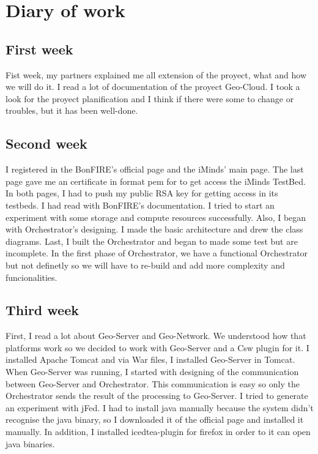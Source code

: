 
\section{Diary of work}
\label{sec:objetivos}

\subsection{First week}
Fist week, my partners explained me all extension of the proyect, what and how we will do it.
I read a lot of documentation of the proyect Geo-Cloud.
I took a look for the proyect planification and I think if there were some to change or troubles, but it has been well-done.

\subsection{Second week}
I registered in the BonFIRE's official page\cite{BF} and the iMinds' main page\cite{VW}. The last page gave me an certificate in format pem for to get access the iMinds TestBed. In both pages, I had to push my public RSA key for getting access in its testbeds.
I had read with BonFIRE's documentation. I tried to start an experiment with some storage and compute resources successfully.
Also, I began with Orchestrator's designing. I made the basic architecture and drew the class diagrams.
Last, I built the Orchestrator and  began to made some test but are incomplete. In the first phase of Orchestrator, we have a functional Orchestrator but not definetly so we will have to re-build and add more complexity and funcionalities.

\subsection{Third week}

First, I read a lot about Geo-Server\cite{GS} and Geo-Network\cite{GN}. We understood how that platforms work so we decided to work with Geo-Server and a Csw plugin for it. I installed Apache Tomcat and via War files, I installed Geo-Server in Tomcat.
When Geo-Server was running, I started with designing of the communication between Geo-Server and Orchestrator. This communication is easy so only the Orchestrator sends the result of the processing to Geo-Server.
I tried to generate an experiment with jFed\cite{jFed}. I had to install java manually because the system didn't recognise the java binary, so I downloaded it of the official page and installed it manually. In addition, I installed icedtea-plugin for firefox in order to it can open java binaries.

